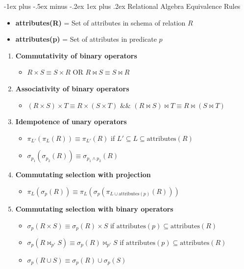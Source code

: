 \documentclass[10pt,landscape]{article}
\makeatletter
\newcommand{\subsubsubsection}{\@startsection{subsubsection}{3}{0mm}%
                                {-1ex plus -.5ex minus -.2ex}%
                                {1ex plus .2ex}%
                                {\normalfont\scriptsize\bfseries}}
\newcommand{\1}{\mathmybb{1}}
\makeatother
\begin{document}
\begin{multicols*}{3}
\subsubsubsection{Relational Algebra Equivalence Rules}
\begin{itemize}
    \item {\color{blue}\textbf{attributes(R)}} = Set of attributes in schema of relation $R$
    \item {\color{blue}\textbf{attributes(p)}} = Set of attributes in predicate $p$
\end{itemize}
\begin{enumerate}
    \item \textbf{Commutativity of binary operators}
    \begin{itemize}
        \item $R \times S \equiv S \times R$ OR $R \Join S \equiv S \Join R$
    \end{itemize}
    \item \textbf{Associativity of binary operators}
    \begin{itemize}
        \item $(R \times S) \times T \equiv R \times (S \times T)$ $\&\&$ $(R \Join S) \Join T \equiv R \Join (S \Join T)$
    \end{itemize}
    \item \textbf{Idempotence of unary operators}
    \begin{itemize}
        \item $\pi_{L'}(\pi_L(R)) \equiv \pi_{L'}(R)$ if $L' \subseteq L \subseteq \text{attributes}(R)$
        \item $\sigma_{p_1}(\sigma_{p_2}(R)) \equiv \sigma_{p_1 \wedge p_2}(R)$
    \end{itemize}
    \item \textbf{Commutating selection with projection}
    \begin{itemize}
        \item $\pi_L(\sigma_p(R)) \equiv \pi_L(\sigma_p(\pi_{L \cup \text{attributes}(p)}(R)))$
    \end{itemize}
    \item \textbf{Commutating selection with binary operators}
    \begin{itemize}
        \item $\sigma_p(R \times S) \equiv \sigma_p(R) \times S$ if $\text{attributes}(p) \subseteq \text{attributes}(R)$
        \item $\sigma_p(R \Join_{p'} S) \equiv \sigma_p(R) \Join_{p'} S$ if $\text{attributes}(p) \subseteq \text{attributes}(R)$
        \item $\sigma_p(R \cup S) \equiv \sigma_p(R) \cup \sigma_p(S)$

\end{itemize}
\end{enumerate}
\end{multicols*}
\end{document}
